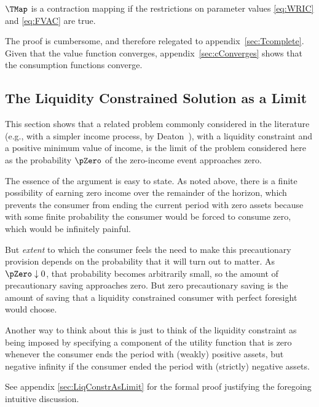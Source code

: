 \documentclass[titlepage]{\econtex}\providecommand{\texname}{BufferStockTheory}%
\begin{document}
\setcounter{theorem}{0}
\begin{theorem}
  \label{thm:contmap} $\TMap$ is a contraction mapping if
  the restrictions on parameter values \eqref{eq:WRIC} and
  \eqref{eq:FVAC} are true.
\end{theorem}

The proof is cumbersome, and therefore relegated to
appendix~\ref{sec:Tcomplete}.  Given that the value function
converges, appendix~\ref{sec:cConverges} shows that the consumption
functions converge.

\hypertarget{The-Liquidity-Constrained-Solution-as-a-Limit}{}
\subsection{The Liquidity Constrained Solution as a Limit} \label{sec:deatonIsLimit}

This section shows that a related problem commonly considered in the
literature (e.g., with a simpler income process, by
Deaton~\citeyearpar{deatonLiqConstr}), with a liquidity constraint
and a positive minimum value of income, is the limit of the problem
considered here as the probability $\pZero$ of the zero-income event
approaches zero.

The essence of the argument is easy to state.  As noted above, there is a finite possibility of earning zero income over the remainder of the horizon, which prevents
the consumer from ending the current period with zero assets because
with some finite probability the consumer would be forced to consume zero,
which would be infinitely painful.

But \textit{extent} to which the consumer feels the need to make this
precautionary provision depends on the probability that it will turn
out to matter.  As $\pZero \downarrow 0$, that probability becomes
arbitrarily small, so the amount of precautionary saving approaches zero.
But zero precautionary saving is the amount of saving that a liquidity
constrained consumer with perfect foresight would choose.

Another way to think about this is just to think of the liquidity
constraint as being imposed by specifying a component of the utility
function that is zero whenever the consumer ends the period with
(weakly) positive assets, but negative infinity if the consumer
ended the period with (strictly) negative assets.

See appendix \ref{sec:LiqConstrAsLimit} for the formal proof justifying the
foregoing intuitive discussion.
\end{document}
